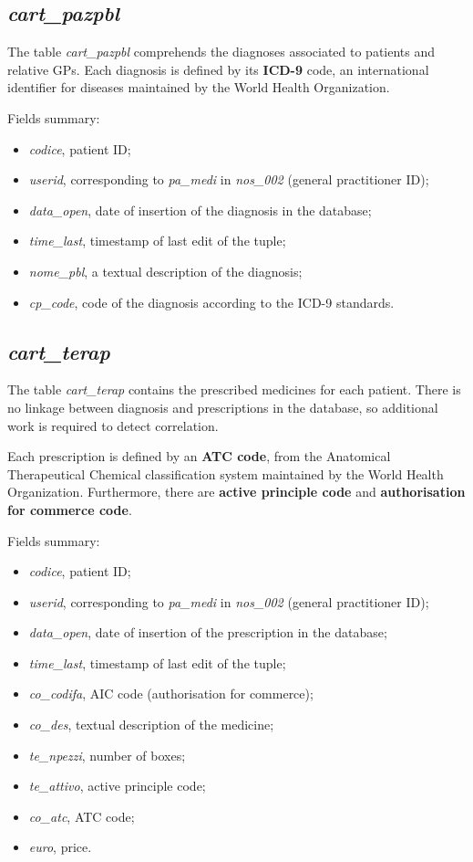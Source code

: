 \subsection{\textit{cart\_pazpbl}}
The table \textit{cart\_pazpbl} comprehends the diagnoses associated to patients and relative GPs. Each diagnosis is defined by its \textbf{ICD-9} code, an international identifier for diseases maintained by the World Health Organization. 

Fields summary:
\begin{itemize}
	\item \textit{codice}, patient ID;
	\item \textit{userid}, corresponding to \textit{pa\_medi }in \textit{nos\_002 }(general practitioner ID);
	\item \textit{data\_open}, date of insertion of the diagnosis in the database;
	\item \textit{time\_last}, timestamp of last edit of the tuple;
	\item \textit{nome\_pbl}, a textual description of the diagnosis;
	\item \textit{cp\_code}, code of the diagnosis according to the ICD-9 standards.
\end{itemize}

\subsection{\textit{cart\_terap}}
The table \textit{cart\_terap} contains the prescribed medicines for each patient. There is no linkage between diagnosis and prescriptions in the database, so additional work is required to detect correlation.

Each prescription is defined by an \textbf{ATC code}, from the Anatomical Therapeutical Chemical classification system maintained by the World Health Organization. Furthermore, there are \textbf{active principle code} and \textbf{authorisation for commerce code}.

Fields summary:
\begin{itemize}
	\item \textit{codice}, patient ID;
	\item \textit{userid}, corresponding to \textit{pa\_medi }in \textit{nos\_002} (general practitioner ID);
	\item \textit{data\_open}, date of insertion of the prescription in the database;
	\item \textit{time\_last}, timestamp of last edit of the tuple;
	\item \textit{co\_codifa}, AIC code (authorisation for commerce);
	\item \textit{co\_des}, textual description of the medicine;
	\item \textit{te\_npezzi}, number of boxes;
	\item \textit{te\_attivo}, active principle code;
	\item \textit{co\_atc}, ATC code;
	\item \textit{euro}, price.
\end{itemize}

